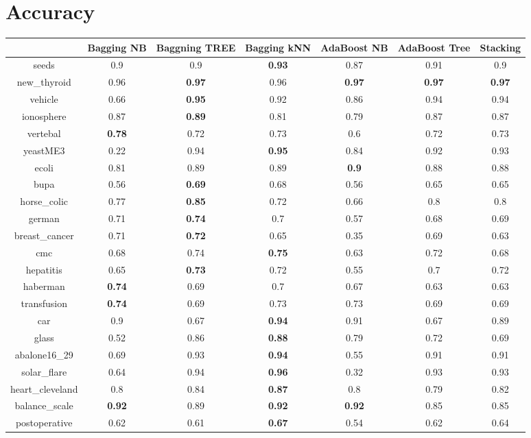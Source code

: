 \documentclass{article}%
\begin{document}
%
\normalsize%
\section*{Accuracy}%
\begin{tabular}{c|cccccc}%
&Bagging NB&Baggning TREE&Bagging kNN&AdaBoost NB&AdaBoost Tree&Stacking\\%
\hline%
seeds&0.9&0.9&\textbf{0.93}&0.87&0.91&0.9\\%
new\_thyroid&0.96&\textbf{0.97}&0.96&\textbf{0.97}&\textbf{0.97}&\textbf{0.97}\\%
vehicle&0.66&\textbf{0.95}&0.92&0.86&0.94&0.94\\%
ionosphere&0.87&\textbf{0.89}&0.81&0.79&0.87&0.87\\%
vertebal&\textbf{0.78}&0.72&0.73&0.6&0.72&0.73\\%
yeastME3&0.22&0.94&\textbf{0.95}&0.84&0.92&0.93\\%
ecoli&0.81&0.89&0.89&\textbf{0.9}&0.88&0.88\\%
bupa&0.56&\textbf{0.69}&0.68&0.56&0.65&0.65\\%
horse\_colic&0.77&\textbf{0.85}&0.72&0.66&0.8&0.8\\%
german&0.71&\textbf{0.74}&0.7&0.57&0.68&0.69\\%
breast\_cancer&0.71&\textbf{0.72}&0.65&0.35&0.69&0.63\\%
cmc&0.68&0.74&\textbf{0.75}&0.63&0.72&0.68\\%
hepatitis&0.65&\textbf{0.73}&0.72&0.55&0.7&0.72\\%
haberman&\textbf{0.74}&0.69&0.7&0.67&0.63&0.63\\%
transfusion&\textbf{0.74}&0.69&0.73&0.73&0.69&0.69\\%
car&0.9&0.67&\textbf{0.94}&0.91&0.67&0.89\\%
glass&0.52&0.86&\textbf{0.88}&0.79&0.72&0.69\\%
abalone16\_29&0.69&0.93&\textbf{0.94}&0.55&0.91&0.91\\%
solar\_flare&0.64&0.94&\textbf{0.96}&0.32&0.93&0.93\\%
heart\_cleveland&0.8&0.84&\textbf{0.87}&0.8&0.79&0.82\\%
balance\_scale&\textbf{0.92}&0.89&\textbf{0.92}&\textbf{0.92}&0.85&0.85\\%
postoperative&0.62&0.61&\textbf{0.67}&0.54&0.62&0.64\\%
\end{tabular}

%
\end{document}
